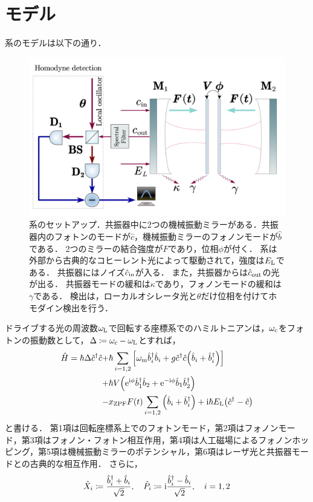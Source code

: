     \section{モデル}
      系のモデルは以下の通り．
      \begin{figure}[H]
        \centering
        \includegraphics[width = 0.5\linewidth]{./src/Enhancing_optomechanical_force_sensing_utilizing_synthetic_magnetism/1.png}
        \caption{
          系のセットアップ．共振器中に2つの機械振動ミラーがある．共振器内のフォトンのモードが$\hat{c}$，機械振動ミラーのフォノンモードが$\hat{b}$である．
          2つのミラーの結合強度が$F$であり，位相$\phi$が付く．
          系は外部から古典的なコヒーレント光によって駆動されて，強度は$E_{\mathrm{L}}$である．
          共振器にはノイズ$\hat{c}_{\mathrm{in}}$が入る．
          また，共振器からは$\hat{c}_{\mathrm{out}}$の光が出る．
          共振器モードの緩和は$\kappa$であり，フォノンモードの緩和は$\gamma$である．
          検出は，ローカルオシレータ光と$\theta$だけ位相を付けてホモダイン検出を行う．
        }
      \end{figure}
      ドライブする光の周波数$\omega_{\mathrm{L}}$で回転する座標系でのハミルトニアンは，$\omega_{\mathrm{c}}$をフォトンの振動数として，$\Delta \coloneqq \omega_{\mathrm{c}} - \omega_{\mathrm{L}}$とすれば，
      \begin{align}
        \hat{H} = \hbar\Delta\hat{c}^{\dag}\hat{c} +& \hbar\sum_{i = 1, 2} \qty[\omega_{\mathrm{m}}\hat{b}^{\dag}_i\hat{b}_i + g\hat{c}^{\dag}\hat{c}\qty(\hat{b}_i + \hat{b}^{\dag}_i)] \\ 
        +& \hbar V\qty(\mathrm{e}^{\mathrm{i}\phi}\hat{b}^{\dag}_1\hat{b}_2 + \mathrm{e}^{-\mathrm{i}\phi}\hat{b}_1\hat{b}^{\dag}_2) \\ 
        -& x_{\mathrm{ZPF}}F(t)\sum_{i = 1, 2}\qty(\hat{b}_i + \hat{b}^{\dag}_i) + \mathrm{i}\hbar E_{\mathrm{L}}\qty(\hat{c}^{\dag} - \hat{c})
      \end{align}
      と書ける．
      第1項は回転座標系上でのフォトンモード，第2項はフォノンモード，第3項はフォノン・フォトン相互作用，第4項は人工磁場によるフォノンホッピング，第5項は機械振動ミラーのポテンシャル，第6項はレーザ光と共振器モードとの古典的な相互作用．
      さらに，
      \begin{align}
        \hat{X}_i \coloneqq \frac{\hat{b}^{\dag}_i + \hat{b}_i}{\sqrt{2}}, \quad \hat{P}_i \coloneqq \mathrm{i}\frac{\hat{b}^{\dag}_i - \hat{b}_i}{\sqrt{2}}, \quad i = 1, 2
      \end{align}
